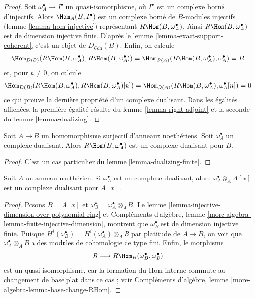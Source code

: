 \begin{proof}
Soit $\omega_A^\bullet \to I^\bullet$ un quasi-isomorphisme, où $I^\bullet$ est un complexe borné d'injectifs.
Alors $\Hom_A(B, I^\bullet)$ est un complexe borné de $B$-modules injectifs
(lemme \ref{lemma-hom-injective}) représentant $R\Hom(B, \omega_A^\bullet)$.
Ainsi $R\Hom(B, \omega_A^\bullet)$ est de dimension injective finie.
D'après le lemme \ref{lemma-exact-support-coherent}, c'est un objet de $D_{\textit{Coh}}(B)$.
Enfin, on calcule
$$
\Hom_{D(B)}(R\Hom(B, \omega_A^\bullet), R\Hom(B, \omega_A^\bullet)) =
\Hom_{D(A)}(R\Hom(B, \omega_A^\bullet), \omega_A^\bullet) = B
$$
et, pour $n \not = 0$, on calcule
$$
\Hom_{D(B)}(R\Hom(B, \omega_A^\bullet), R\Hom(B, \omega_A^\bullet)[n]) =
\Hom_{D(A)}(R\Hom(B, \omega_A^\bullet), \omega_A^\bullet[n]) = 0
$$
ce qui prouve la dernière propriété d'un complexe dualisant.
Dans les égalités affichées, la première égalité résulte du lemme \ref{lemma-right-adjoint}
et la seconde du lemme \ref{lemma-dualizing}.
\end{proof}

\begin{lemma}
\label{lemma-dualizing-quotient}
Soit $A \to B$ un homomorphisme surjectif d'anneaux noethériens.
Soit $\omega_A^\bullet$ un complexe dualisant.
Alors $R\Hom(B, \omega_A^\bullet)$ est un complexe dualisant pour $B$.
\end{lemma}

\begin{proof}
C'est un cas particulier du lemme \ref{lemma-dualizing-finite}.
\end{proof}

\begin{lemma}
\label{lemma-dualizing-polynomial-ring}
Soit $A$ un anneau noethérien. Si $\omega_A^\bullet$ est un complexe dualisant,
alors $\omega_A^\bullet \otimes_A A[x]$ est un complexe dualisant pour $A[x]$.
\end{lemma}

\begin{proof}
Posons $B = A[x]$ et $\omega_B^\bullet = \omega_A^\bullet \otimes_A B$.
Le lemme \ref{lemma-injective-dimension-over-polynomial-ring} et Compléments d'algèbre, lemme \ref{more-algebra-lemma-finite-injective-dimension},
montrent que $\omega_B^\bullet$ est de dimension injective finie.
Puisque $H^i(\omega_B^\bullet) = H^i(\omega_A^\bullet) \otimes_A B$ par platitude de $A \to B$, on voit que $\omega_A^\bullet \otimes_A B$
a des modules de cohomologie de type fini.
Enfin, le morphisme
$$
B \longrightarrow R\Hom_B(\omega_B^\bullet, \omega_B^\bullet)
$$
est un quasi-isomorphisme, car la formation du Hom interne commute
au changement de base plat dans ce cas ; voir
Compléments d'algèbre, lemme \ref{more-algebra-lemma-base-change-RHom}.
\end{proof}


